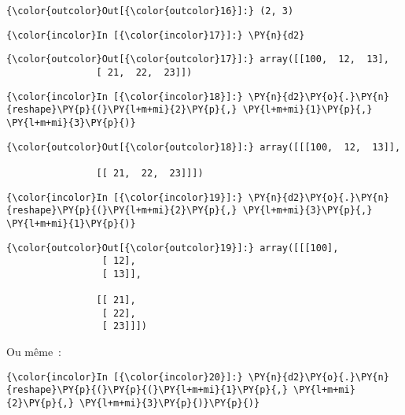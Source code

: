 \begin{Verbatim}[commandchars=\\\{\}]
{\color{outcolor}Out[{\color{outcolor}16}]:} (2, 3)
\end{Verbatim}
            
    \begin{Verbatim}[commandchars=\\\{\}]
{\color{incolor}In [{\color{incolor}17}]:} \PY{n}{d2}
\end{Verbatim}


\begin{Verbatim}[commandchars=\\\{\}]
{\color{outcolor}Out[{\color{outcolor}17}]:} array([[100,  12,  13],
                [ 21,  22,  23]])
\end{Verbatim}
            
    \begin{Verbatim}[commandchars=\\\{\}]
{\color{incolor}In [{\color{incolor}18}]:} \PY{n}{d2}\PY{o}{.}\PY{n}{reshape}\PY{p}{(}\PY{l+m+mi}{2}\PY{p}{,} \PY{l+m+mi}{1}\PY{p}{,} \PY{l+m+mi}{3}\PY{p}{)}
\end{Verbatim}


\begin{Verbatim}[commandchars=\\\{\}]
{\color{outcolor}Out[{\color{outcolor}18}]:} array([[[100,  12,  13]],
         
                [[ 21,  22,  23]]])
\end{Verbatim}
            
    \begin{Verbatim}[commandchars=\\\{\}]
{\color{incolor}In [{\color{incolor}19}]:} \PY{n}{d2}\PY{o}{.}\PY{n}{reshape}\PY{p}{(}\PY{l+m+mi}{2}\PY{p}{,} \PY{l+m+mi}{3}\PY{p}{,} \PY{l+m+mi}{1}\PY{p}{)}
\end{Verbatim}


\begin{Verbatim}[commandchars=\\\{\}]
{\color{outcolor}Out[{\color{outcolor}19}]:} array([[[100],
                 [ 12],
                 [ 13]],
         
                [[ 21],
                 [ 22],
                 [ 23]]])
\end{Verbatim}
            
    Ou même~:

    \begin{Verbatim}[commandchars=\\\{\}]
{\color{incolor}In [{\color{incolor}20}]:} \PY{n}{d2}\PY{o}{.}\PY{n}{reshape}\PY{p}{(}\PY{p}{(}\PY{l+m+mi}{1}\PY{p}{,} \PY{l+m+mi}{2}\PY{p}{,} \PY{l+m+mi}{3}\PY{p}{)}\PY{p}{)}
\end{Verbatim}


